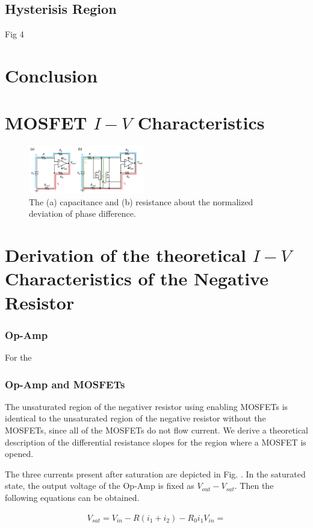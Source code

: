 \documentclass[%
 aip,
amsmath,amssymb,
reprint,
]{revtex4-1}
\begin{document}
\subsection{Hysterisis Region}
Fig 4

\section{\label{sec:Conclusion} Conclusion}

\appendix

\section{\label{mosfetiv}MOSFET $I-V$ Characteristics}
\begin{figure}[!h]
  \centering
  \includegraphics[width=0.45\textwidth]{./figures/TheoryCalc.png}
  \caption{The (a) capacitance and (b) resistance about the normalized deviation of phase difference. }
  \label{fig:stdphiandRC}
\end{figure}

\section{Derivation of the theoretical $I-V$ Characteristics of the Negative Resistor}
\subsubsection{\label{opampiv}Op-Amp}
For the 

\subsubsection{\label{opamp_mosfetiv}Op-Amp and MOSFETs}
The unsaturated region of the negativer resistor using enabling MOSFETs is identical to the unsaturated region of the negative resistor without the MOSFETs, since all of the MOSFETs do not flow current. We derive a theoretical description of the differential resistance slopes for the region where a MOSFET is opened. 

The three currents present after saturation are depicted in Fig. . In the saturated state, the output voltage of the Op-Amp is fixed as $V_{out}-V_{sat}$. Then the following equations can be obtained.

\begin{eqnarray*}
  V_{sat} = V_{in} - R(i_1+i_2)-R_0i_1
  V_{in} = 
\end{eqnarray*}
\end{document}
